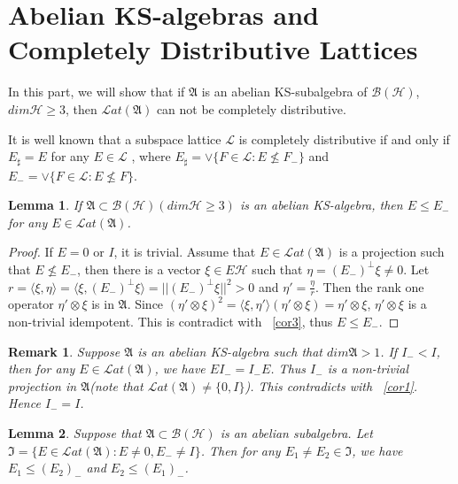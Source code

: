 \documentclass[a4paper,10pt]{amsart}
\newtheorem{lemma}{Lemma}[section]
\newtheorem{remark}{Remark}[section]
\theoremstyle{refs}
\newcommand{\AAA}{\mathfrak A}
\newcommand{\BBB}{\mathcal B}
\newcommand{\HHH}{\mathcal H} %
\newcommand{\Lat}{\mathcal Lat}
\begin{document}
\section{Abelian KS-algebras and Completely Distributive Lattices}


In this part, we will show that if $\AAA$ is an abelian KS-subalgebra of
$\BBB(\HHH)$, $dim\HHH \geq 3$, then $\Lat(\AAA)$ can not be completely
distributive.

It is well known that a subspace lattice $\mathcal{L}$ is completely
distributive if and only if $E_{\sharp}=E$ for any $E \in \mathcal{L}$
\cite{L}, where
$E_{\sharp}=\vee\{F\in\mathcal{L}:E \nleq F_{-}\}$ and
$E_{-}=\vee\{F\in\mathcal{L}:E \nleq F\}$.

\begin{lemma} \label{lma10}
If $\AAA \subset \BBB(\HHH)(dim\HHH \geq 3)$ is an abelian KS-algebra,
then $E \leq E_{-}$ for any $E\in\Lat(\AAA)$.
\end{lemma}

\begin{proof}
If $E=0$ or $I$, it is trivial. Assume that $E \in \Lat(\AAA)$ is a
projection such that $E \nleq E_{-}$, then there is a vector
$\xi\in E\HHH$ such that $\eta=(E_{-})^{\perp} \xi \neq 0$.
Let $ r =
\langle\xi,\eta\rangle=\langle\xi,(E_{-})^{\perp}\xi\rangle=||(E_{-})^{\perp}
\xi||^2>0$ and
$\eta ' = \frac{\eta}{r}$. Then the rank one operator $\eta '
\otimes \xi$ is in $\AAA$. Since $(\eta ' \otimes
\xi)^{2}=\langle\xi,\eta ' \rangle(\eta ' \otimes\xi) = \eta ' \otimes\xi$,
$\eta ' \otimes \xi$ is a non-trivial idempotent.
This is contradict with ~\cref{cor3}, thus $E \leq E_{-}$.
\end{proof}

\begin{remark} \label{rem5}
Suppose $\AAA$ is an abelian KS-algebra such that $dim\AAA > 1$. If $I_{-}<I$,
then for any $E\in
\Lat(\AAA)$, we
have $EI_{-}=I_{-}E$. Thus $I_{-}$ is a non-trivial projection in $\AAA$(note
that $\Lat(\AAA) \neq \{0, I\}$).
This contradicts with ~\cref{cor1}. Hence $I_{-}=I$.
\end{remark}

\begin{lemma} \label{lma11}
Suppose that $\AAA\subset\BBB(\HHH)$ is an abelian
subalgebra. Let $\mathfrak{I}=\{E \in \Lat(\AAA): E \neq 0,
E_{-} \neq I\}$. Then for any $E_{1} \neq E_{2}\in\mathfrak{I}$, we have
$E_{1} \leq (E_{2})_{-}$ and $E_{2} \leq (E_{1})_{-}$.
\end{lemma}
\end{document}
